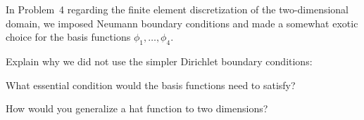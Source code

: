In Problem~4 regarding the finite element discretization of the
two-dimensional domain, we imposed Neumann boundary conditions
and made a somewhat exotic choice for the basis functions 
$\phi_1, \ldots, \phi_4$.

Explain why we did not use the simpler Dirichlet boundary conditions:

What essential condition would the basis functions need to satisfy?

How would you generalize a hat function to two dimensions?
